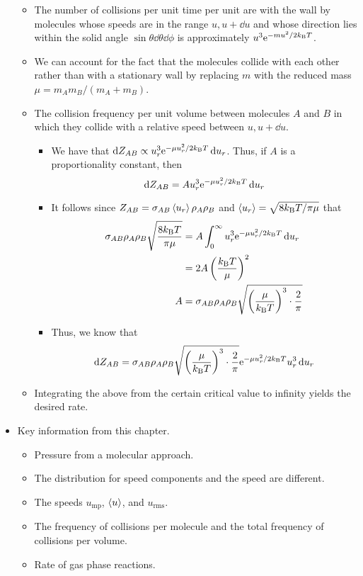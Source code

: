 \documentclass[../notes.tex]{subfiles}
\begin{document}
\begin{itemize}
\begin{itemize}
        \item The number of collisions per unit time per unit are with the wall by molecules whose speeds are in the range $u,u+\dd{u}$ and whose direction lies within the solid angle $\sin\theta\dd{\theta}\dd{\phi}$ is approximately $u^3\e[-mu^2/2\kB T]$.
        \item We can account for the fact that the molecules collide with each other rather than with a stationary wall by replacing $m$ with the reduced mass $\mu=m_Am_B/(m_A+m_B)$.
        \item The collision frequency per unit volume between molecules $A$ and $B$ in which they collide with a relative speed between $u,u+\dd{u}$.
        \begin{itemize}
            \item We have that $\dd{Z_{AB}}\propto u_r^3\e[-\mu u_r^2/2\kB T]\dd{u_r}$. Thus, if $A$ is a proportionality constant, then
            \begin{equation*}
                \dd{Z_{AB}} = Au_r^3\e[-\mu u_r^2/2\kB T]\dd{u_r}
            \end{equation*}
            \item It follows since $Z_{AB}=\sigma_{AB}\prb{u_r}\rho_A\rho_B$ and $\prb{u_r}=\sqrt{8\kB T/\pi\mu}$ that
            \begin{align*}
                \sigma_{AB}\rho_A\rho_B\sqrt{\frac{8\kB T}{\pi\mu}} &= A\int_0^\infty u_r^3\e[-\mu u_r^2/2\kB T]\dd{u_r}\\
                &= 2A\left( \frac{\kB T}{\mu} \right)^2\\
                A &= \sigma_{AB}\rho_A\rho_B\sqrt{\left( \frac{\mu}{\kB T} \right)^3\cdot\frac{2}{\pi}}
            \end{align*}
            \item Thus, we know that
            \begin{equation*}
                \dd{Z_{AB}} = \sigma_{AB}\rho_A\rho_B\sqrt{\left( \frac{\mu}{\kB T} \right)^3\cdot\frac{2}{\pi}}\e[-\mu u_r^2/2\kB T]u_r^3\dd{u_r}
            \end{equation*}
        \end{itemize}
        \item Integrating the above from the certain critical value to infinity yields the desired rate.
    \end{itemize}
    \item Key information from this chapter.
    \begin{itemize}
        \item Pressure from a molecular approach.
        \item The distribution for speed components and the speed are different.
        \item The speeds $u_\text{mp}$, $\prb{u}$, and $u_\text{rms}$.
        \item The frequency of collisions per molecule and the total frequency of collisions per volume.
        \item Rate of gas phase reactions.
    \end{itemize}
\end{itemize}
\end{document}
